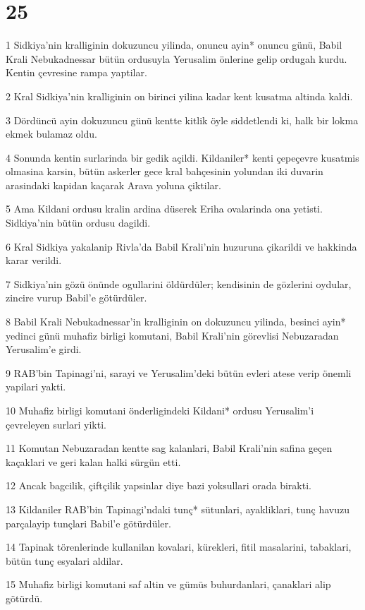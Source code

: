 \chapter{25}

\par 1 Sidkiya'nin kralliginin dokuzuncu yilinda, onuncu ayin* onuncu günü, Babil Krali Nebukadnessar bütün ordusuyla Yerusalim önlerine gelip ordugah kurdu. Kentin çevresine rampa yaptilar.
\par 2 Kral Sidkiya'nin kralliginin on birinci yilina kadar kent kusatma altinda kaldi.
\par 3 Dördüncü ayin dokuzuncu günü kentte kitlik öyle siddetlendi ki, halk bir lokma ekmek bulamaz oldu.
\par 4 Sonunda kentin surlarinda bir gedik açildi. Kildaniler* kenti çepeçevre kusatmis olmasina karsin, bütün askerler gece kral bahçesinin yolundan iki duvarin arasindaki kapidan kaçarak Arava yoluna çiktilar.
\par 5 Ama Kildani ordusu kralin ardina düserek Eriha ovalarinda ona yetisti. Sidkiya'nin bütün ordusu dagildi.
\par 6 Kral Sidkiya yakalanip Rivla'da Babil Krali'nin huzuruna çikarildi ve hakkinda karar verildi.
\par 7 Sidkiya'nin gözü önünde ogullarini öldürdüler; kendisinin de gözlerini oydular, zincire vurup Babil'e götürdüler.
\par 8 Babil Krali Nebukadnessar'in kralliginin on dokuzuncu yilinda, besinci ayin* yedinci günü muhafiz birligi komutani, Babil Krali'nin görevlisi Nebuzaradan Yerusalim'e girdi.
\par 9 RAB'bin Tapinagi'ni, sarayi ve Yerusalim'deki bütün evleri atese verip önemli yapilari yakti.
\par 10 Muhafiz birligi komutani önderligindeki Kildani* ordusu Yerusalim'i çevreleyen surlari yikti.
\par 11 Komutan Nebuzaradan kentte sag kalanlari, Babil Krali'nin safina geçen kaçaklari ve geri kalan halki sürgün etti.
\par 12 Ancak bagcilik, çiftçilik yapsinlar diye bazi yoksullari orada birakti.
\par 13 Kildaniler RAB'bin Tapinagi'ndaki tunç* sütunlari, ayakliklari, tunç havuzu parçalayip tunçlari Babil'e götürdüler.
\par 14 Tapinak törenlerinde kullanilan kovalari, kürekleri, fitil masalarini, tabaklari, bütün tunç esyalari aldilar.
\par 15 Muhafiz birligi komutani saf altin ve gümüs buhurdanlari, çanaklari alip götürdü.
